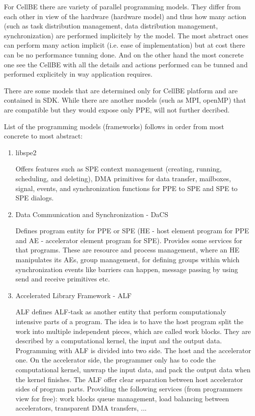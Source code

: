 For CellBE there are variety of parallel programming models. They differ from each other in view of the hardware (hardware model) and thus how many action (such as task distribution management, data distribution management, synchronization) are performed implicitely by the model. The most abstract ones can perform many action implicit (i.e. ease of implementation) but at cost there can be no performance tunning done. And on the other hand the most concrete one see the CellBE with all the details and actions performed can be tunned and performed explicitely in way application requires.

There are some models that are determined only for CellBE platform and are contained in SDK. While there are another models (such as MPI, openMP) that are compatible but they would expose only PPE, will not further decribed.

List of the programming models (frameworks) follows in order from most concrete to most abstract:
\begin{enumerate}
\item {libspe2}
\par
Offers features such as SPE context management (creating, running, scheduling, and deleting), DMA primitives for data transfer, mailboxes, signal, events, and synchronization functions for PPE to SPE and SPE to SPE dialogs. 

\item {Data Communication and Synchronization - DaCS}
\par
Defines program entity for PPE or SPE (HE - host element program for PPE and AE - accelerator element program for SPE). Provides some services for that programs. These are resource and process management, where an HE manipulates its AEs, group management, for defining groups within which synchronization events like barriers can happen, message passing by using send and receive primitives etc.

\item {Accelerated Library Framework - ALF}
\par
ALF defines ALF-task as another entity that perform computationaly intensive parts of a program. The idea is to have the host program split the work into multiple independent pieces, which are called work blocks. They are described by a computational kernel, the input and the output data. Programming with ALF is divided into two side. The host and the accelerator one. On the accelerator side, the programmer only has to code the computational kernel, unwrap the input data, and pack the output data when the kernel finishes. The ALF offer clear separation between host accelerator sides of program parts. Providing the following services (from programmers view for free): work blocks queue management, load balancing between accelerators, transparent DMA transfers, ...

\end{enumerate}

